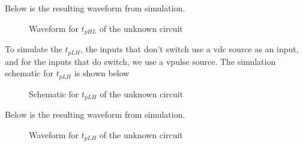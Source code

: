 \documentclass[12pt]{article}
\begin{document}
Below is the resulting waveform from simulation.
\begin{figure} [H]
    \centering
    \caption{Waveform for $t_{pHL}$ of the unknown circuit}
\end{figure}

To simulate the $t_{pLH}$, the inputs that don't switch use a vdc source as an input, and for the inputs that do switch, 
we use a vpulse source. 
The simulation schematic for $t_{pLH}$ is shown below
\begin{figure} [H]
    \centering
    \caption{Schematic for $t_{pLH}$ of the unknown circuit}
\end{figure}
Below is the resulting waveform from simulation.
\begin{figure} [H]
    \centering
    \caption{Waveform for $t_{pLH}$ of the unknown circuit}
\end{figure}
\end{document}
